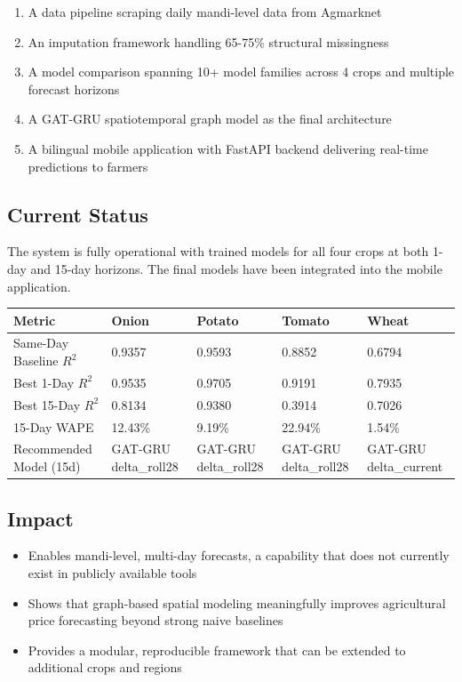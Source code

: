 \documentclass[12pt,a4paper]{article}
\begin{document}
\begin{enumerate}
\item A data pipeline scraping daily mandi-level data from Agmarknet
\item An imputation framework handling 65-75\% structural missingness
\item A model comparison spanning 10+ model families across 4 crops and multiple forecast horizons
\item A GAT-GRU spatiotemporal graph model as the final architecture
\item A bilingual mobile application with FastAPI backend delivering real-time predictions to farmers
\end{enumerate}
\subsection{Current Status}
The system is fully operational with trained models for all four crops at both 1-day and 15-day horizons. The final models have been integrated into the mobile application.

\begin{table}[H]
\centering
\begin{tabular}{lllll}
\toprule
\textbf{Metric} & \textbf{Onion} & \textbf{Potato} & \textbf{Tomato} & \textbf{Wheat} \\
\midrule
Same-Day Baseline $R^2$ & 0.9357 & 0.9593 & 0.8852 & 0.6794 \\
Best 1-Day $R^2$ & 0.9535 & 0.9705 & 0.9191 & 0.7935 \\
Best 15-Day $R^2$ & 0.8134 & 0.9380 & 0.3914 & 0.7026 \\
15-Day WAPE & 12.43\% & 9.19\% & 22.94\% & 1.54\% \\
Recommended Model (15d) & GAT-GRU delta\_roll28 & GAT-GRU delta\_roll28 & GAT-GRU delta\_roll28 & GAT-GRU delta\_current \\
\bottomrule
\end{tabular}
\end{table}
\subsection{Impact}
\begin{itemize}
\item Enables mandi-level, multi-day forecasts, a capability that does not currently exist in publicly available tools
\item Shows that graph-based spatial modeling meaningfully improves agricultural price forecasting beyond strong naive baselines
\item Provides a modular, reproducible framework that can be extended to additional crops and regions
\end{itemize}
\end{document}
